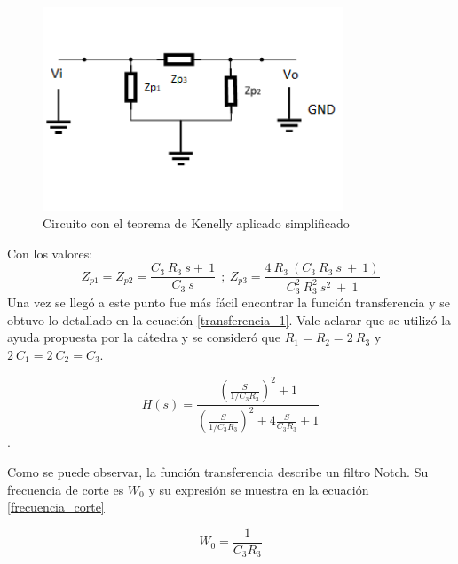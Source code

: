 \documentclass[12pt,a4paper]{article}
\begin{document}
\begin{figure}[H]                                                       
    \centering\includegraphics[width=0.8\textwidth]{circuitoconkenellysimplificado.png}
    \caption{Circuito con el teorema de Kenelly aplicado simplificado}
    \label{circuitoconkenellysimplificado}
\end{figure}

Con los valores:
\begin{equation}
Z_{p1}=Z_{p2}=\dfrac{C_3 \ R_3 \ s + \ 1}{C_3 \ s} \ \ ; \ Z_{p3}=\dfrac{4 \ R_3 \ (C_3 \ R_3 \ s \ + \ 1)}{C_3^2 \ R_3^2 \ s^2 \ + \ 1}
\end{equation}
Una vez se llegó a este punto fue más fácil encontrar la función transferencia y se obtuvo lo detallado en la ecuación \ref{transferencia_1}.
Vale aclarar que se utilizó la ayuda propuesta por la cátedra y se consideró que $R_{1} = R_{2}
= 2 \ R_{3}$ y $2 \ C_{1} = 2 \ C_{2} = C_{3}$.

\begin{equation} H(s) = \frac{(\frac{S}{1/C_{3} R_{3}})^2 + 1} {(\frac{S}{1/C_{3}R_{3}})^2 + 4\frac{S}{C_{3}R_{3}} + 1}  \label{transferencia_1}\end{equation}.

Como se puede observar, la función transferencia describe un filtro Notch. Su frecuencia de corte es
$W_0$ y su expresión se muestra en la ecuación \ref{frecuencia_corte}

\begin{equation} W_{0} =  \frac{1}{C_{3} R_{3}}  \label{frecuencia_corte}\end{equation}
\end{document}
